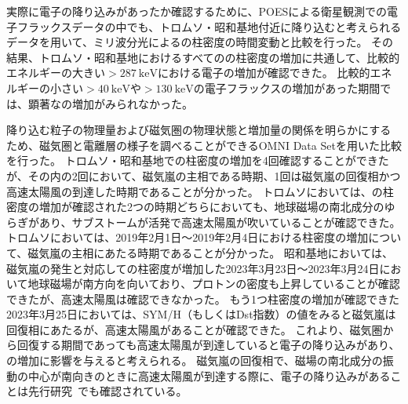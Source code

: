 実際に電子の降り込みがあったか確認するために、POESによる衛星観測での電子フラックスデータの中でも、トロムソ・昭和基地付近に降り込むと考えられるデータを用いて、ミリ波分光によるの柱密度の時間変動と比較を行った。
その結果、トロムソ・昭和基地におけるすべてのの柱密度の増加に共通して、比較的エネルギーの大きい$>287\ \mathrm{keV}$における電子の増加が確認できた。
比較的エネルギーの小さい$>40\ \mathrm{keV}$や$>130\ \mathrm{keV}$の電子フラックスの増加があった期間では、顕著なの増加がみられなかった。\par

降り込む粒子の物理量および磁気圏の物理状態と増加量の関係を明らかにするため、磁気圏と電離層の様子を調べることができるOMNI Data Setを用いた比較を行った。
トロムソ・昭和基地での柱密度の増加を4回確認することができたが、その内の2回において、磁気嵐の主相である時期、1回は磁気嵐の回復相かつ高速太陽風の到達した時期であることが分かった。
トロムソにおいては、の柱密度の増加が確認された2つの時期どちらにおいても、地球磁場の南北成分のゆらぎがあり、サブストームが活発で高速太陽風が吹いていることが確認できた。
トロムソにおいては、2019年2月1日～2019年2月4日における柱密度の増加について、磁気嵐の主相にあたる時期であることが分かった。
昭和基地においては、磁気嵐の発生と対応しての柱密度が増加した2023年3月23日〜2023年3月24日において地球磁場が南方向を向いており、プロトンの密度も上昇していることが確認できたが、高速太陽風は確認できなかった。
もう1つ柱密度の増加が確認できた2023年3月25日においては、SYM/H（もしくはDst指数）の値をみると磁気嵐は回復相にあたるが、高速太陽風があることが確認できた。
これより、磁気圏から回復する期間であっても高速太陽風が到達していると電子の降り込みがあり、の増加に影響を与えると考えられる。
磁気嵐の回復相で、磁場の南北成分の振動の中心が南向きのときに高速太陽風が到達する際に、電子の降り込みがあることは先行研究~\cite{miyoshi2013high}でも確認されている。
